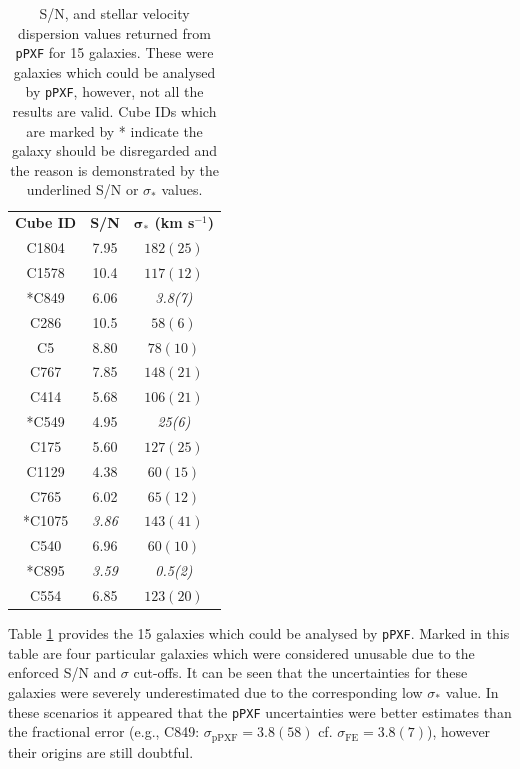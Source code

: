 \documentclass[12pt, twocolumn, nofootinbib]{revtex4-1}    %
\begin{document}
\begin{table}
\begin{center}
\begin{tabular}{c@{\hskip 20pt}c@{\hskip 20pt}c} 
\hline
\textbf{Cube ID} & \textbf{S/N} & \textbf{$\boldsymbol{\sigma_*}$ (km s$^{-1}$)} \\ [0.5ex] 
C1804 & 7.95 & $182(25)$ \\

C1578 & 10.4 & $117(12)$ \\

*C849 & 6.06 & \emph{3.8(7)} \\

C286 & 10.5 & $58(6)$ \\

C5 & 8.80 & $78(10)$ \\

C767 & 7.85 & $148(21)$ \\

C414 & 5.68 & $106(21)$ \\

*C549 & 4.95 & \emph{25(6)} \\

C175 & 5.60 & $127(25)$ \\

C1129 & 4.38 & $60(15)$ \\

C765 & 6.02 & $65(12)$ \\

*C1075 & \emph{3.86} & $143(41)$ \\

C540 & 6.96 & $60(10)$ \\

*C895 & \emph{3.59} & \emph{0.5(2)} \\

C554 & 6.85 & $123(20)$ \\

 \hline
\end{tabular}
\caption{S/N, and stellar velocity dispersion values returned from \texttt{pPXF} for 15 galaxies. These were galaxies which could be analysed by \texttt{pPXF}, however, not all the results are valid. Cube IDs which are marked by * indicate the galaxy should be disregarded and the reason is demonstrated by the underlined S/N or $\sigma_*$ values.}
\label{table:ppxf_sigma_sn}
\end{center}
\end{table}

Table \ref{table:ppxf_sigma_sn} provides the 15 galaxies which could be analysed by \texttt{pPXF}. Marked in this table are four particular galaxies which were considered unusable due to the enforced S/N and $\sigma$ cut-offs. It can be seen that the uncertainties for these galaxies were severely underestimated due to the corresponding low $\sigma_*$ value. In these scenarios it appeared that the \texttt{pPXF} uncertainties were better estimates than the fractional error (e.g., C849: $\sigma_{\text{pPXF}}=3.8(58)$ cf. $\sigma_{\text{FE}}=3.8(7)$), however their origins are still doubtful.
\end{document}
